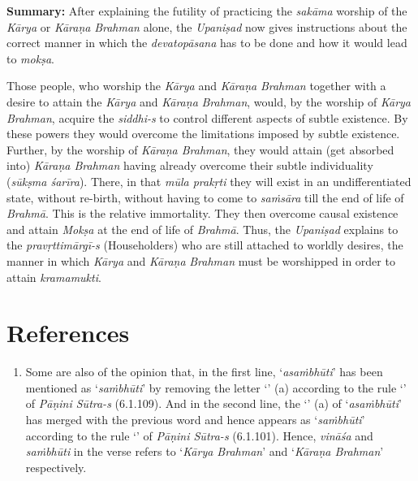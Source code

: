 \textbf{Summary:} After explaining the futility of practicing the \emph{sakāma} worship of the \emph{Kārya} or \emph{Kāraṇa} \emph{Brahman} alone, the \emph{Upaniṣad} now gives instructions about the correct manner in which the \emph{devatopāsana} has to be done and how it would lead to \emph{mokṣa}.

Those people, who worship the \emph{Kārya} and \emph{Kāraṇa} \emph{Brahman} together with a desire to attain the \emph{Kārya} and \emph{Kāraṇa} \emph{Brahman}, would, by the worship of \emph{Kārya} \emph{Brahman}, acquire the \emph{siddhi-s} to control different aspects of subtle existence. By these powers they would overcome the limitations imposed by subtle existence. Further, by the worship of \emph{Kāraṇa Brahman}, they would attain (get absorbed into) \emph{Kāraṇa Brahman} having already overcome their subtle individuality (\emph{sūkṣma śarīra}). There, in that \emph{mūla prakṛti} they will exist in an undifferentiated state, without re-birth, without having to come to \emph{saṁsāra} till the end of life of \emph{Brahmā}. This is the relative immortality. They then overcome causal existence and attain \emph{Mokṣa} at the end of life of \emph{Brahmā}. Thus, the \emph{Upaniṣad} explains to the \emph{pravṛttimārgī-s} (Householders) who are still attached to worldly desires, the manner in which \emph{Kārya} and \emph{Kāraṇa} \emph{Brahman} must be worshipped in order to attain \emph{kramamukti}.

\section*{References}

\begin{enumerate}
\itemsep=0pt
\item
  Some are also of the opinion that, in the first line, `\emph{asaṁbhūti}' has been mentioned as `\emph{saṁbhūti}' by removing the letter `' (a) according to the rule `' of \emph{Pāṇini Sūtra-s} (6.1.109). And in the second line, the `' (a) of `\emph{asaṁbhūti}' has merged with the previous word and hence appears as `\emph{saṁbhūti}' according to the rule `' of \emph{Pāṇini Sūtra-s} (6.1.101). Hence, \emph{vināśa} and \emph{saṁbhūti} in the verse refers to `\emph{Kārya Brahman}' and `\emph{Kāraṇa Brahman}' respectively.
\end{enumerate}
